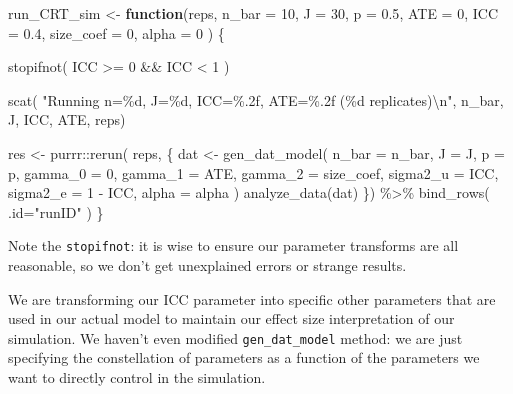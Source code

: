 \documentclass[
]{book}
\newenvironment{Shaded}{\begin{snugshade}}{\end{snugshade}}
\newcommand{\AttributeTok}[1]{\textcolor[rgb]{0.77,0.63,0.00}{#1}}
\newcommand{\ControlFlowTok}[1]{\textcolor[rgb]{0.13,0.29,0.53}{\textbf{#1}}}
\newcommand{\DecValTok}[1]{\textcolor[rgb]{0.00,0.00,0.81}{#1}}
\newcommand{\FloatTok}[1]{\textcolor[rgb]{0.00,0.00,0.81}{#1}}
\newcommand{\FunctionTok}[1]{\textcolor[rgb]{0.00,0.00,0.00}{#1}}
\newcommand{\NormalTok}[1]{#1}
\newcommand{\OtherTok}[1]{\textcolor[rgb]{0.56,0.35,0.01}{#1}}
\newcommand{\SpecialCharTok}[1]{\textcolor[rgb]{0.00,0.00,0.00}{#1}}
\newcommand{\StringTok}[1]{\textcolor[rgb]{0.31,0.60,0.02}{#1}}
\begin{document}
\begin{Shaded}
\begin{Highlighting}[]
\NormalTok{run\_CRT\_sim }\OtherTok{\textless{}{-}} \ControlFlowTok{function}\NormalTok{(reps, }
                        \AttributeTok{n\_bar =} \DecValTok{10}\NormalTok{, }\AttributeTok{J =} \DecValTok{30}\NormalTok{, }\AttributeTok{p =} \FloatTok{0.5}\NormalTok{,}
                        \AttributeTok{ATE =} \DecValTok{0}\NormalTok{, }\AttributeTok{ICC =} \FloatTok{0.4}\NormalTok{,}
                        \AttributeTok{size\_coef =} \DecValTok{0}\NormalTok{, }\AttributeTok{alpha =} \DecValTok{0}\NormalTok{ ) \{}

  \FunctionTok{stopifnot}\NormalTok{( ICC }\SpecialCharTok{\textgreater{}=} \DecValTok{0} \SpecialCharTok{\&\&}\NormalTok{ ICC }\SpecialCharTok{\textless{}} \DecValTok{1}\NormalTok{ )}
  
  \FunctionTok{scat}\NormalTok{( }\StringTok{"Running n=\%d, J=\%d, ICC=\%.2f, ATE=\%.2f (\%d replicates)}\SpecialCharTok{\textbackslash{}n}\StringTok{"}\NormalTok{,}
\NormalTok{        n\_bar, J, ICC, ATE, reps)}

\NormalTok{  res }\OtherTok{\textless{}{-}} 
\NormalTok{    purrr}\SpecialCharTok{::}\FunctionTok{rerun}\NormalTok{( reps, \{}
\NormalTok{      dat }\OtherTok{\textless{}{-}} \FunctionTok{gen\_dat\_model}\NormalTok{( }\AttributeTok{n\_bar =}\NormalTok{ n\_bar, }\AttributeTok{J =}\NormalTok{ J, }\AttributeTok{p =}\NormalTok{ p,}
                            \AttributeTok{gamma\_0 =} \DecValTok{0}\NormalTok{, }\AttributeTok{gamma\_1 =}\NormalTok{ ATE, }\AttributeTok{gamma\_2 =}\NormalTok{ size\_coef,}
                            \AttributeTok{sigma2\_u =}\NormalTok{ ICC, }\AttributeTok{sigma2\_e =} \DecValTok{1} \SpecialCharTok{{-}}\NormalTok{ ICC,}
                            \AttributeTok{alpha =}\NormalTok{ alpha )}
      \FunctionTok{analyze\_data}\NormalTok{(dat)}
\NormalTok{    \}) }\SpecialCharTok{\%\textgreater{}\%}
    \FunctionTok{bind\_rows}\NormalTok{( }\AttributeTok{.id=}\StringTok{"runID"}\NormalTok{ )}
\NormalTok{\}}
\end{Highlighting}
\end{Shaded}

Note the \texttt{stopifnot}: it is wise to ensure our parameter transforms are all reasonable, so we don't get unexplained errors or strange results.

We are transforming our ICC parameter into specific other parameters that are used in our actual model to maintain our effect size interpretation of our simulation.
We haven't even modified \texttt{gen\_dat\_model} method: we are just specifying the constellation of parameters as a function of the parameters we want to directly control in the simulation.
\end{document}
